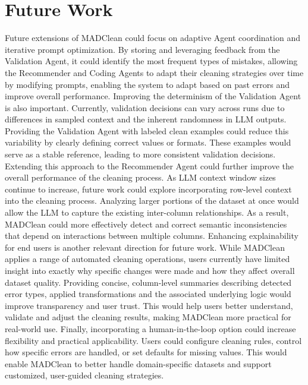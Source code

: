 \section{Future Work}
Future extensions of MADClean could focus on adaptive Agent coordination and iterative prompt optimization. 
By storing and leveraging feedback from the Validation Agent, it could identify the most frequent types of mistakes, allowing the Recommender and Coding Agents to adapt their cleaning strategies over time by modifying prompts, enabling the system to adapt based on past errors and improve overall performance.
\newline\newline
Improving the determinism of the Validation Agent is also important.
Currently, validation decisions can vary across runs due to differences in sampled context and the inherent randomness in LLM outputs. 
Providing the Validation Agent with labeled clean examples could reduce this variability by clearly defining correct values or formats. 
These examples would serve as a stable reference, leading to more consistent validation decisions. 
Extending this approach to the Recommender Agent could further improve the overall performance of the cleaning process.
\newline\newline
As LLM context window sizes continue to increase, future work could explore incorporating row-level context into the cleaning process.
Analyzing larger portions of the dataset at once would allow the LLM to capture the existing inter-column relationships. 
As a result, MADClean could more effectively detect and correct semantic inconsistencies that depend on interactions between multiple columns.
\newline\newline
Enhancing explainability for end users is another relevant direction for future work. 
While MADClean applies a range of automated cleaning operations, users currently have limited insight into exactly why specific changes were made and how they affect overall dataset quality. 
Providing concise, column-level summaries describing detected error types, applied transformations and the associated underlying logic would improve transparency and user trust. 
This would help users better understand, validate and adjust the cleaning results, making MADClean more practical for real-world use.
\newline\newline
Finally, incorporating a human-in-the-loop option could increase flexibility and practical applicability. 
Users could configure cleaning rules, control how specific errors are handled, or set defaults for missing values. 
This would enable MADClean to better handle domain-specific datasets and support customized, user-guided cleaning strategies.
